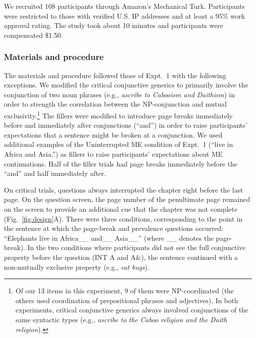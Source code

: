 \documentclass[10pt,letterpaper]{article}
\begin{document}
We recruited 108 participants through Amazon's Mechanical Turk.
Participants were restricted to those with verified U.S. IP addresses and at least a 95\% work approval rating. 
The study took about 10 minutes and participants were compensated \$1.50.

\subsubsection{Materials and procedure}

The materials and procedure  followed those of Expt.~1 with the following exceptions.
We modified the critical conjunctive generics to primarily involve the conjunction of two noun phrases (e.g., \emph{ascribe to Cabooism and Daithism}) in order to strength the correlation between the NP-conjunction and mutual exclusivity.\footnote{
Of our 13 items in this experiment, 9 of them were NP-coordinated (the others used coordination of prepositional phrases and adjectives).  In both experiments, critical conjunctive generics always involved conjunctions of the same syntactic types (e.g., \emph{ascribe to the Caboo religion and the Daith religion}).
}
The fillers were modified to introduce page breaks immediately before and immediately after conjunctions (``and'') in order to raise participants' expectations that a sentence might be broken at a conjunction.
We used additional examples of the Uninterrupted ME condition of Expt.~1 (``live in Africa and Asia.'') as fillers to raise participants' expectations about ME continuations.
Half of the filler trials had page breaks immediately before the ``and'' and half immediately after.

On critical trials, questions always interrupted the chapter right before the last page.
On the question screen, the page number of the penultimate page remained on the screen to provide an additional cue that the chapter was not complete (Fig.~\ref{fig:design}A).
There were three conditions, corresponding to the point in the sentence at which the page-break and prevalence questions occurred: ``Elephants live in Africa\_\_ and\_\_ Asia\_\_'' (where \_\_ denotes the page-break).
In the two conditions where participants did not see the full conjunctive property before the question (INT A and A\&), the sentence continued with a non-mutually exclusive property (e.g., \emph{eat bugs}). 
\end{document}
